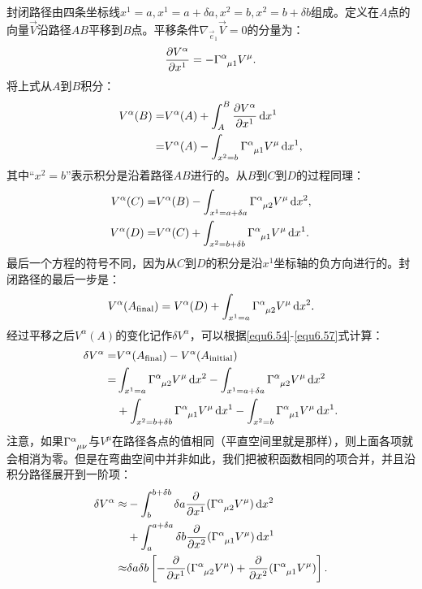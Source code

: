 封闭路径由四条坐标线$x^1 = a, x^1 = a + \delta a, x^2 = b, x^2 = b + \delta b$组成。定义在$A$点的向量$\vec{V}$沿路径$AB$平移到$B$点。平移条件$\nabla_{\vec{e}_1} \vec{V} = 0$的分量为：
\begin{equation}
    \frac{\partial V^\alpha}{\partial x^1} = -\Gamma\indices{^\alpha_{\mu 1}} V^\mu.
\label{equ6.53}
\end{equation}
将上式从$A$到$B$积分：
\begin{equation}
\begin{split}
    V^\alpha (B) =& V^\alpha (A) + \int_A^B \frac{\partial V^\alpha}{\partial x^1} \, \rd x^1 \\
    =& V^\alpha (A) - \int_{x^2 = b} \Gamma\indices{^\alpha_{\mu 1}} V^\mu \, \rd x^1,
\end{split}
\label{equ6.54}
\end{equation}
其中“$x^2 = b$”表示积分是沿着路径$AB$进行的。从$B$到$C$到$D$的过程同理：
\begin{align}
    V^\alpha (C) =& V^\alpha (B) - \int_{x^1 = a + \delta a} \Gamma\indices{^\alpha_{\mu 2}} V^\mu \,\rd x^2, \label{equ6.55} \\
    V^\alpha (D) =& V^\alpha (C) + \int_{x^2 = b + \delta b} \Gamma\indices{^\alpha_{\mu 1}} V^\mu \,\rd x^1. \label{equ6.56}
\end{align}
最后一个方程的符号不同，因为从$C$到$D$的积分是沿$x^1$坐标轴的负方向进行的。封闭路径的最后一步是：
\begin{equation}
    V^\alpha (A_{\text{final}}) = V^\alpha (D) + \int_{x^1 = a} \Gamma\indices{^\alpha_{\mu 2}} V^\mu \, \rd x^2.
\label{equ6.57}
\end{equation}
经过平移之后$V^\alpha (A)$的变化记作$\delta V^\alpha$，可以根据\eqref{equ6.54}-\eqref{equ6.57}式计算：
\begin{align}
    \delta V^\alpha =& V^\alpha (A_{\text{final}}) - V^\alpha (A_{\text{initial}}) \notag \\
    =& \int_{x^1 = a} \Gamma\indices{^\alpha_{\mu 2}} V^\mu \,\rd x^2 - \int_{x^1 = a + \delta a} \Gamma\indices{^\alpha_{\mu 2}} V^\mu \,\rd x^2 \notag \\
    &+ \int_{x^2 = b + \delta b} \Gamma\indices{^\alpha_{\mu 1}} V^\mu \, \rd x^1 - \int_{x^2 = b} \Gamma\indices{^\alpha_{\mu 1}} V^\mu \,\rd x^1. \label{equ6.58}
\end{align}
注意，如果$\Gamma\indices{^\alpha_{\mu \nu}}$与$V^\mu$在路径各点的值相同（平直空间里就是那样），则上面各项就会相消为零。但是在弯曲空间中并非如此，我们把被积函数相同的项合并，并且沿积分路径展开到一阶项：
\begin{align}
    \delta V^\alpha \approx & -\int_b^{b + \delta b} \delta a \frac{\partial}{\partial x^1} (\Gamma\indices{^\alpha_{\mu 2}} V^\mu) \, \rd x^2 \notag \\
    & + \int_a^{a + \delta a} \delta b \frac{\partial}{\partial x^2} (\Gamma\indices{^\alpha_{\mu 1}} V^\mu) \, \rd x^1 \label{equ6.59} \\
    \approx & \delta a \delta b \left[ -\frac{\partial}{\partial x^1} (\Gamma\indices{^\alpha_{\mu 2}} V^\mu) + \frac{\partial}{\partial x^2} (\Gamma\indices{^\alpha_{\mu 1}} V^\mu) \right]. \label{equ6.60}
\end{align}
